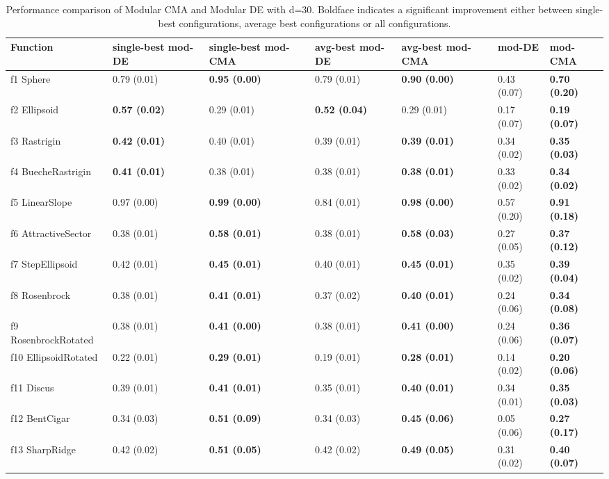 \begin{table}
\caption{Performance comparison of Modular CMA and Modular DE with d=30. Boldface indicates a significant improvement either between single-best configurations, average best configurations or all configurations.}
\begin{tabular}{lllllll}
\toprule
Function & single-best mod-DE & single-best mod-CMA & avg-best mod-DE & avg-best mod-CMA & mod-DE & mod-CMA \\
\midrule
f1 Sphere & 0.79 (0.01) & \textbf{0.95 (0.00)} & 0.79 (0.01) & \textbf{0.90 (0.00)} & 0.43 (0.07) & \textbf{0.70 (0.20)} \\
f2 Ellipsoid & \textbf{0.57 (0.02)} & 0.29 (0.01) & \textbf{0.52 (0.04)} & 0.29 (0.01) & 0.17 (0.07) & \textbf{0.19 (0.07)} \\
f3 Rastrigin & \textbf{0.42 (0.01)} & 0.40 (0.01) & 0.39 (0.01) & \textbf{0.39 (0.01)} & 0.34 (0.02) & \textbf{0.35 (0.03)} \\
f4 BuecheRastrigin & \textbf{0.41 (0.01)} & 0.38 (0.01) & 0.38 (0.01) & \textbf{0.38 (0.01)} & 0.33 (0.02) & \textbf{0.34 (0.02)} \\
f5 LinearSlope & 0.97 (0.00) & \textbf{0.99 (0.00)} & 0.84 (0.01) & \textbf{0.98 (0.00)} & 0.57 (0.20) & \textbf{0.91 (0.18)} \\
f6 AttractiveSector & 0.38 (0.01) & \textbf{0.58 (0.01)} & 0.38 (0.01) & \textbf{0.58 (0.03)} & 0.27 (0.05) & \textbf{0.37 (0.12)} \\
f7 StepEllipsoid & 0.42 (0.01) & \textbf{0.45 (0.01)} & 0.40 (0.01) & \textbf{0.45 (0.01)} & 0.35 (0.02) & \textbf{0.39 (0.04)} \\
f8 Rosenbrock & 0.38 (0.01) & \textbf{0.41 (0.01)} & 0.37 (0.02) & \textbf{0.40 (0.01)} & 0.24 (0.06) & \textbf{0.34 (0.08)} \\
f9 RosenbrockRotated & 0.38 (0.01) & \textbf{0.41 (0.00)} & 0.38 (0.01) & \textbf{0.41 (0.00)} & 0.24 (0.06) & \textbf{0.36 (0.07)} \\
f10 EllipsoidRotated & 0.22 (0.01) & \textbf{0.29 (0.01)} & 0.19 (0.01) & \textbf{0.28 (0.01)} & 0.14 (0.02) & \textbf{0.20 (0.06)} \\
f11 Discus & 0.39 (0.01) & \textbf{0.41 (0.01)} & 0.35 (0.01) & \textbf{0.40 (0.01)} & 0.34 (0.01) & \textbf{0.35 (0.03)} \\
f12 BentCigar & 0.34 (0.03) & \textbf{0.51 (0.09)} & 0.34 (0.03) & \textbf{0.45 (0.06)} & 0.05 (0.06) & \textbf{0.27 (0.17)} \\
f13 SharpRidge & 0.42 (0.02) & \textbf{0.51 (0.05)} & 0.42 (0.02) & \textbf{0.49 (0.05)} & 0.31 (0.02) & \textbf{0.40 (0.07)} \\

\end{tabular}
\end{table}
